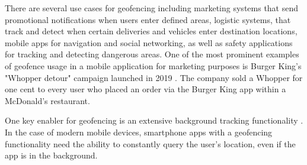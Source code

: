 There are several use cases for geofencing including marketing systems that send promotional notifications when users enter defined areas, logistic systems, that track and detect when certain deliveries and vehicles enter destination locations, mobile apps for navigation and social networking, as well as safety applications for tracking and detecting dangerous areas. One of the most prominent examples of geofence usage in a mobile application for marketing purposes is Burger King's "Whopper detour" campaign launched in 2019 \cite{burger_king_whopper_detour}. The company sold a Whopper for one cent to every user who placed an order via the Burger King app within a McDonald's restaurant.

One key enabler for geofencing is an extensive background tracking functionality \cite{geofencing_and_background_tracking}. In the case of modern mobile devices, smartphone apps with a geofencing functionality need the ability to constantly query the user's location, even if the app is in the background.

